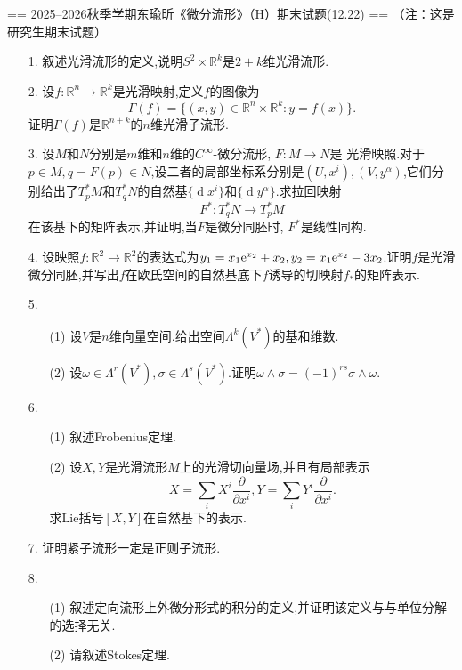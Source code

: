 
== 2025--2026秋季学期东瑜昕《微分流形》（H）期末试题(12.22) ==
（注：这是研究生期末试题）
\begin{itemize}
    \item[1.]叙述光滑流形的定义,说明$S^2\times\mathbb{R}^k$是$2+k$维光滑流形.
    \item[2.]设$f:\mathbb{R}^n\to\mathbb{R}^k$是光滑映射,定义$f$的图像为\[\Gamma(f)=\{(x,y)\in\mathbb{R}^n\times\mathbb{R}^k:y=f(x)\}.\]证明$\Gamma(f)$是$\mathbb{R}^{n+k}$的$n$维光滑子流形.
    \item[3.]设$M$和$N$分别是$m$维和$n$维的$C^\infty$-微分流形, $F:M\to N$是 光滑映照.对于$p\in M,q=F(p)\in N$,设二者的局部坐标系分别是$(U,x^i),(V,y^\alpha)$,它们分别给出了$T_p^*M$和$T_q^*N$的自然基$\{\operatorname{d} x^i\}$和$\{\operatorname{d} y^\alpha\}$.求拉回映射\[F^*:T_q^*N\to T_p^*M\]在该基下的矩阵表示,并证明,当$F$是微分同胚时, $F^*$是线性同构.
    \item[4.]设映照$f:\mathbb{R}^2\to\mathbb{R}^2$的表达式为$y_1=x_1\textup{e}^{x_2}+x_2,y_2=x_1\textup{e}^{x_2}-3x_2$.证明$f$是光滑微分同胚,并写出$f$在欧氏空间的自然基底下$f$诱导的切映射$f_*$的矩阵表示.
    \item[5.]
    \begin{enumerate}
        \item[(1)]设$V$是$n$维向量空间.给出空间$\Lambda^k(V^*)$的基和维数.
        \item[(2)]设$\omega\in\Lambda^r(V^*),\sigma\in\Lambda^s(V^*)$.证明$\omega\wedge\sigma=(-1)^{rs}\sigma\wedge\omega$.
    \end{enumerate}
    \item[6.]
    \begin{enumerate}
        \item[(1)]叙述Frobenius定理.
        \item[(2)]设$X,Y$是光滑流形$M$上的光滑切向量场,并且有局部表示\[X=\sum_iX^i\frac{\partial}{\partial x^i},Y=\sum_iY^i\frac{\partial}{\partial x^i}.\]求Lie括号$[X,Y]$在自然基下的表示.
    \end{enumerate}
    \item[7.]证明紧子流形一定是正则子流形.
    \item[8.]
    \begin{enumerate}
        \item[(1)]叙述定向流形上外微分形式的积分的定义,并证明该定义与与单位分解的选择无关.
        \item[(2)]请叙述Stokes定理.
    \end{enumerate}
\end{itemize}

